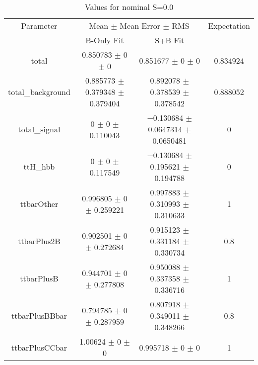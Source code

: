 \begin{table}
\centering
\caption{Values for nominal S=0.0}
\begin{tabular}{cccc}
\toprule
Parameter & \multicolumn{2}{c}{Mean $\pm$ Mean Error $\pm$ RMS} & Expectation\\
 & B-Only Fit & S+B Fit & \\
\midrule
total & \num{0.850783} $\pm$ \num{0} $\pm$ \num{0} & \num{0.851677} $\pm$ \num{0} $\pm$ \num{0} & \num{0.834924}\\
total\_background & \num{0.885773} $\pm$ \num{0.379348} $\pm$ \num{0.379404} & \num{0.892078} $\pm$ \num{0.378539} $\pm$ \num{0.378542} & \num{0.888052}\\
total\_signal & \num{0} $\pm$ \num{0} $\pm$ \num{0.110043} & \num{-0.130684} $\pm$ \num{0.0647314} $\pm$ \num{0.0650481} & \num{0}\\
ttH\_hbb & \num{0} $\pm$ \num{0} $\pm$ \num{0.117549} & \num{-0.130684} $\pm$ \num{0.195621} $\pm$ \num{0.194788} & \num{0}\\
ttbarOther & \num{0.996805} $\pm$ \num{0} $\pm$ \num{0.259221} & \num{0.997883} $\pm$ \num{0.310993} $\pm$ \num{0.310633} & \num{1}\\
ttbarPlus2B & \num{0.902501} $\pm$ \num{0} $\pm$ \num{0.272684} & \num{0.915123} $\pm$ \num{0.331184} $\pm$ \num{0.330734} & \num{0.8}\\
ttbarPlusB & \num{0.944701} $\pm$ \num{0} $\pm$ \num{0.277808} & \num{0.950088} $\pm$ \num{0.337358} $\pm$ \num{0.336716} & \num{1}\\
ttbarPlusBBbar & \num{0.794785} $\pm$ \num{0} $\pm$ \num{0.287959} & \num{0.807918} $\pm$ \num{0.349011} $\pm$ \num{0.348266} & \num{0.8}\\
ttbarPlusCCbar & \num{1.00624} $\pm$ \num{0} $\pm$ \num{0} & \num{0.995718} $\pm$ \num{0} $\pm$ \num{0} & \num{1}\\
\bottomrule
\end{tabular}
\end{table}